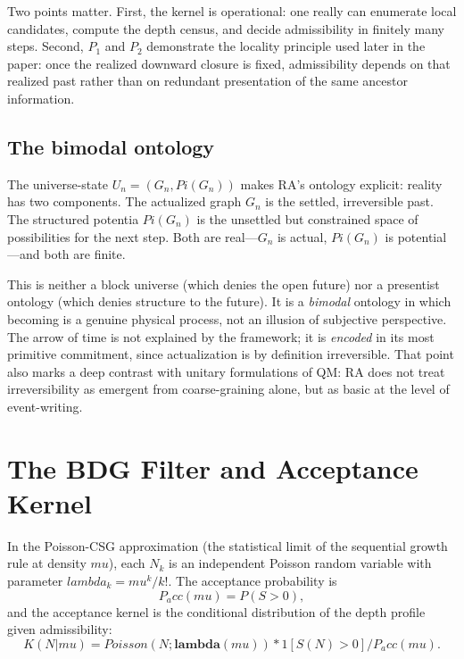 \documentclass[11pt]{article}
\def\mu{mu}%
\def\Pi{Pi}%
\def\lambda{lambda}%
\def\mathrm#1{#1}%
\def\mathbf#1{#1}%
\def\mathbb#1{#1}%
\def\frac#1#2{#1/#2}%
\def\cdot{*}%
\def\Pacc{P_acc}%
\newcommand{\Pacc}{P_{\mathrm{acc}}}
\newcommand{\Pot}{\Pi}
\begin{document}
Two points matter. First, the kernel is operational: one really can enumerate local candidates, compute the depth census, and decide admissibility in finitely many steps. Second, $P_1$ and $P_2$ demonstrate the locality principle used later in the paper: once the realized downward closure is fixed, admissibility depends on that realized past rather than on redundant presentation of the same ancestor information.

\subsection{The bimodal ontology}

The universe-state $U_n=(G_n,\Pot(G_n))$ makes RA's ontology explicit: reality has two components. The actualized graph $G_n$ is the settled, irreversible past. The structured potentia $\Pot(G_n)$ is the unsettled but constrained space of possibilities for the next step. Both are real---$G_n$ is actual, $\Pot(G_n)$ is potential---and both are finite.

This is neither a block universe (which denies the open future) nor a presentist ontology (which denies structure to the future). It is a \emph{bimodal} ontology in which becoming is a genuine physical process, not an illusion of subjective perspective. The arrow of time is not explained by the framework; it is \emph{encoded} in its most primitive commitment, since actualization is by definition irreversible. That point also marks a deep contrast with unitary formulations of QM: RA does not treat irreversibility as emergent from coarse-graining alone, but as basic at the level of event-writing.

\section{The BDG Filter and Acceptance Kernel}
\label{sec:filter}

In the Poisson-CSG approximation (the statistical limit of the sequential growth rule at density $\mu$), each $N_k$ is an independent Poisson random variable with parameter $\lambda_k=\mu^k/k!$. The acceptance probability is
\begin{equation}
\Pacc(\mu)=\mathbb{P}(S>0),
\end{equation}
and the acceptance kernel is the conditional distribution of the depth profile given admissibility:
\begin{equation}
K(\mathbf{N}|\mu)=\frac{\mathrm{Poisson}(\mathbf{N};\boldsymbol{\lambda}(\mu))\cdot\mathbf{1}[S(\mathbf{N})>0]}{\Pacc(\mu)}.
\end{equation}
\end{document}
